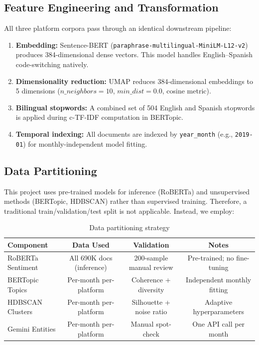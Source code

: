 \documentclass[12pt, letterpaper]{article}
\begin{document}
\subsection{Feature Engineering and Transformation}

All three platform corpora pass through an identical downstream pipeline:
\begin{enumerate}[leftmargin=*]
  \item \textbf{Embedding:} Sentence-BERT (\texttt{paraphrase-multilingual-MiniLM-L12-v2}) produces 384-dimensional dense vectors. This model handles English--Spanish code-switching natively.
  \item \textbf{Dimensionality reduction:} UMAP reduces 384-dimensional embeddings to 5 dimensions ($n\_neighbors=10$, $min\_dist=0.0$, cosine metric).
  \item \textbf{Bilingual stopwords:} A combined set of 504 English and Spanish stopwords is applied during c-TF-IDF computation in BERTopic.
  \item \textbf{Temporal indexing:} All documents are indexed by \texttt{year\_month} (e.g., \texttt{2019-01}) for monthly-independent model fitting.
\end{enumerate}

\subsection{Data Partitioning}

This project uses pre-trained models for inference (RoBERTa) and unsupervised methods (BERTopic, HDBSCAN) rather than supervised training. Therefore, a traditional train/validation/test split is not applicable. Instead, we employ:

\begin{table}[H]
  \centering
  \caption{Data partitioning strategy}
  \label{tab:splits}
  \begin{tabular}{lccc}
    \toprule
    \textbf{Component} & \textbf{Data Used} & \textbf{Validation} & \textbf{Notes} \\
    \midrule
    RoBERTa Sentiment  & All 690K docs (inference) & 200-sample manual review & Pre-trained; no fine-tuning \\
    BERTopic Topics    & Per-month per-platform    & Coherence + diversity      & Independent monthly fitting \\
    HDBSCAN Clusters   & Per-month per-platform    & Silhouette + noise ratio   & Adaptive hyperparameters \\
    Gemini Entities    & Per-month per-platform    & Manual spot-check          & One API call per month \\
    \bottomrule
  \end{tabular}
\end{table}
\end{document}
